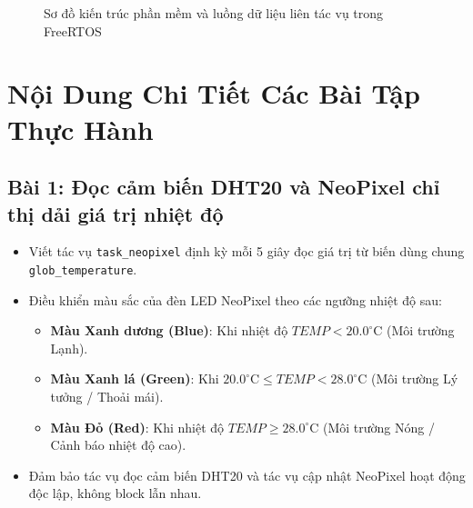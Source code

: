 \begin{figure}[h!]
{\begin{tikzpicture}
\end{tikzpicture}%
}
\caption{Sơ đồ kiến trúc phần mềm và luồng dữ liệu liên tác vụ trong FreeRTOS}
\label{fig:lab3_dataflow}
\end{figure}

\newpage
\section{Nội Dung Chi Tiết Các Bài Tập Thực Hành}

\subsection{Bài 1: Đọc cảm biến DHT20 và NeoPixel chỉ thị dải giá trị nhiệt độ}

\begin{tcolorbox}[
    enhanced, colback=black!2, colframe=black!60, boxrule=1pt, arc=2.5mm, drop shadow,
    attach boxed title to top left={xshift=4mm, yshift=-3mm},
    boxed title style={enhanced, colback=black!85, colframe=black!85, boxrule=1pt, arc=2.5mm, drop shadow, left=6pt, right=6pt, top=2pt, bottom=2pt},
    title=\textcolor{white}{\large\textbf{Yêu cầu đề bài (Trích phiếu bài tập)}}
]
\bfseries
\vspace{0.2cm}
\begin{itemize}
    \item Viết tác vụ \texttt{task\_neopixel} định kỳ mỗi 5 giây đọc giá trị từ biến dùng chung \texttt{glob\_temperature}.
    \item Điều khiển màu sắc của đèn LED NeoPixel theo các ngưỡng nhiệt độ sau:
    \begin{itemize}
        \item \textbf{Màu Xanh dương (Blue)}: Khi nhiệt độ $TEMP < 20.0^\circ\text{C}$ (Môi trường Lạnh).
        \item \textbf{Màu Xanh lá (Green)}: Khi $20.0^\circ\text{C} \le TEMP < 28.0^\circ\text{C}$ (Môi trường Lý tưởng / Thoải mái).
        \item \textbf{Màu Đỏ (Red)}: Khi nhiệt độ $TEMP \ge 28.0^\circ\text{C}$ (Môi trường Nóng / Cảnh báo nhiệt độ cao).
    \end{itemize}
    \item Đảm bảo tác vụ đọc cảm biến DHT20 và tác vụ cập nhật NeoPixel hoạt động độc lập, không block lẫn nhau.
\end{itemize}
\end{tcolorbox}

